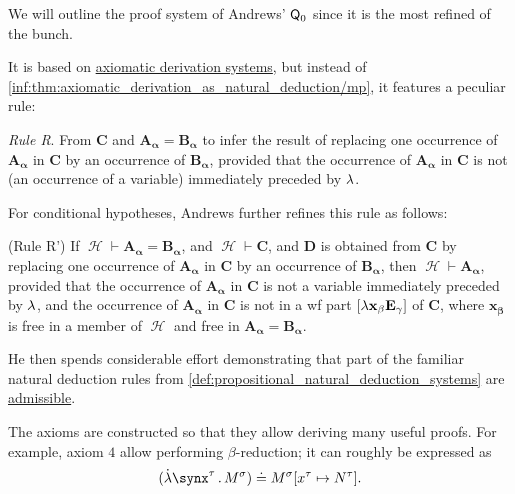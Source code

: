 \begin{remark}
\begin{thmenum}
     We will outline the proof system of Andrews' \( \textsf{\upshape Q}_0 \) since it is the most refined of the bunch.

    It is based on \hyperref[def:axiomatic_derivation_system]{axiomatic derivation systems}, but instead of \ref{inf:thm:axiomatic_derivation_as_natural_deduction/mp}, it features a peculiar rule:
    \begin{displayquote}
      \textit{Rule R}. From \( \mathbf{C} \) and \( \mathbf{A_\alpha} = \mathbf{B_\alpha} \) to infer the result of replacing one occurrence of \( \mathbf{A_\alpha} \) in \( \mathbf{C} \) by an occurrence of \( \mathbf{B_\alpha} \), provided that the occurrence of \( \mathbf{A_\alpha} \) in \( \mathbf{C} \) is not (an occurrence of a variable) immediately preceded by \( {\mathrm \lambda} \).
    \end{displayquote}

    For conditional hypotheses, Andrews further refines this rule as follows:
    \begin{displayquote}
      (Rule R') If \( \mscrH \vdash \mathbf{A_\alpha} = \mathbf{B_\alpha} \), and \( \mscrH \vdash \mathbf{C} \), and \( \mathbf{D} \) is obtained from \( \mathbf{C} \) by replacing one occurrence of \( \mathbf{A_\alpha} \) in \( \mathbf{C} \) by an occurrence of \( \mathbf{B_\alpha} \), then \( \mscrH \vdash \mathbf{A_\alpha} \), provided that the occurrence of \( \mathbf{A_\alpha} \) in \( \mathbf{C} \) is not a variable immediately preceded by \( \mathbf{{\mathrm \lambda}} \), and the occurrence of \( \mathbf{A_\alpha} \) in \( \mathbf{C} \) is not in a wf part \( [\mathbf{{\mathrm \lambda} x_\beta E_\gamma}] \) of \( \mathbf{C} \), where \( \mathbf{x_\beta} \) is free in a member of \( \mscrH \) and free in \( \mathbf{A_\alpha} = \mathbf{B_\alpha} \).
    \end{displayquote}

    He then spends considerable effort demonstrating that part of the familiar natural deduction rules from \cref{def:propositional_natural_deduction_systems} are \hyperref[con:inference_rule_admissibility]{admissible}.

    The axioms are constructed so that they allow deriving many useful proofs. For example, axiom \( 4 \) allow performing \( \beta \)-reduction; it can roughly be expressed as
    \begin{equation*}
      (\qabs {\synx^\tau} M^\sigma) \syneq M^\sigma[x^\tau \mapsto N^\tau].
    \end{equation*}


\end{thmenum}
\end{remark}
